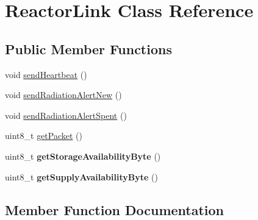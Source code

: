 \hypertarget{class_reactor_link}{}\section{Reactor\+Link Class Reference}
\label{class_reactor_link}
\subsection*{Public Member Functions}
\begin{DoxyCompactItemize}
\item 
void \hyperlink{class_reactor_link_a2b010a6a98cf649168824447794c11aa}{send\+Heartbeat} ()
\item 
void \hyperlink{class_reactor_link_a1f55ee275dfe378da449eb55bfc81cc1}{send\+Radiation\+Alert\+New} ()
\item 
void \hyperlink{class_reactor_link_a4682d1aad7ce27f4e38fb54e739cd834}{send\+Radiation\+Alert\+Spent} ()
\item 
uint8\+\_\+t \hyperlink{class_reactor_link_a179ed18ba40c1f1c56054d36443bc2d4}{get\+Packet} ()
\item 
\hypertarget{class_reactor_link_aee291bc68c1e3736a1078532efc5987b}{}uint8\+\_\+t {\bfseries get\+Storage\+Availability\+Byte} ()\label{class_reactor_link_aee291bc68c1e3736a1078532efc5987b}

\item 
\hypertarget{class_reactor_link_ab0d4e0577a58fc82a3418b9f67345bd7}{}uint8\+\_\+t {\bfseries get\+Supply\+Availability\+Byte} ()\label{class_reactor_link_ab0d4e0577a58fc82a3418b9f67345bd7}

\end{DoxyCompactItemize}


\subsection{Member Function Documentation}
\hypertarget{class_reactor_link_a179ed18ba40c1f1c56054d36443bc2d4}{}
